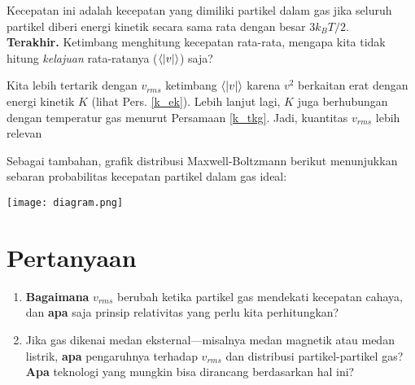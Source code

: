 \documentclass{article}
\begin{document}
\begin{multicols}{2}
		Kecepatan ini adalah kecepatan yang dimiliki partikel dalam gas jika seluruh partikel diberi energi kinetik secara sama rata dengan besar $3k_B T/2$. \\
		
		\textbf{Terakhir.} Ketimbang menghitung kecepatan rata-rata, mengapa kita tidak hitung \textit{kelajuan} rata-ratanya ($\expval{|v|}$) saja?
		
		Kita lebih tertarik dengan $v_{rms}$ ketimbang $\expval{|v|}$ karena $v^2$ berkaitan erat dengan energi kinetik $K$ (lihat Pers. \ref{k_ek}). Lebih lanjut lagi, $K$ juga berhubungan dengan temperatur gas menurut Persamaan \ref{k_tkg}. Jadi, kuantitas $v_{rms}$ lebih relevan
		
		\par Sebagai tambahan, grafik distribusi Maxwell-Boltzmann berikut menunjukkan sebaran probabilitas kecepatan partikel dalam gas ideal:
		
		{
		\vspace{.5em}
		\centering
		\texttt{[image: diagram.png]}
		\par
		}
		
		\section{Pertanyaan}
		\begin{enumerate}
			\item \textbf{Bagaimana} $v_{rms}$ berubah ketika partikel gas mendekati kecepatan cahaya, dan \textbf{apa} saja prinsip relativitas yang perlu kita perhitungkan?
			\item Jika gas dikenai medan eksternal---misalnya medan magnetik atau medan listrik, \textbf{apa} pengaruhnya terhadap $v_{rms}$ dan distribusi partikel-partikel gas? \textbf{Apa} teknologi yang mungkin bisa dirancang berdasarkan hal ini?
		\end{enumerate}
	\end{multicols}
	
\end{document}
